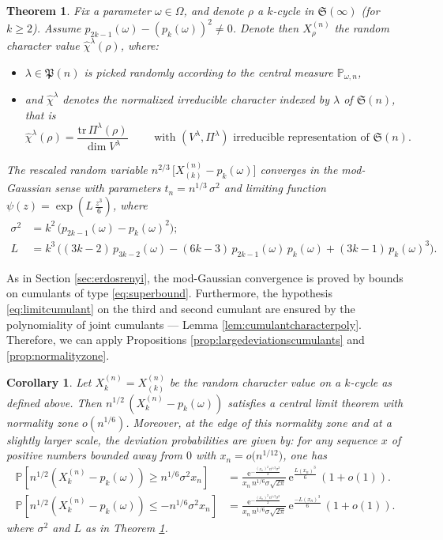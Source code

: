 \documentclass[12pt,a4paper,reqno]{amsart}
\newtheorem{theorem}[lemma]{Theorem}
\newtheorem{corollary}[lemma]{Corollary}
\theoremstyle{remark}
\newcommand{\E}{\mathrm{e}}
\newcommand{\proba}{\mathbb{P}}
\newcommand{\SubGraph}{X^{(n)}}
\newcommand{\RCV}{X^{(n)}_{\rho}}
\newcommand{\RCVk}{X^{(n)}_{(k)}}
\newcommand{\sym}{\mathfrak{S}}
\newcommand{\pym}{\mathfrak{P}}
\begin{document}
\begin{theorem}\label{thm:modgaussianrcv}
Fix a parameter $\omega \in \Omega$, and denote $\rho$ a $k$-cycle in $\sym(\infty)$ (for $k \ge 2$). Assume $p_{2k-1}(\omega)-(p_{k}(\omega))^{2}\neq 0$. Denote then $\RCV$ the random character value $\widehat{\chi}^{\lambda}(\rho)$, where:\vspace{2mm}
\begin{itemize}
\item $\lambda \in \pym(n)$ is picked randomly according to the central measure $\proba_{\omega,n}$, \vspace{2mm}
\item and $\widehat{\chi}^{\lambda}$ denotes the normalized irreducible character indexed by $\lambda$ of $\sym(n)$, that is 
$$\widehat{\chi}^{\lambda}(\rho)=\frac{\mathrm{tr}\, \Pi^{\lambda}(\rho)}{\dim V^{\lambda}}\qquad \text{ with }(V^{\lambda},\Pi^{\lambda}) \text{ irreducible representation of }\sym(n).$$
\end{itemize}
The rescaled random variable $n^{2/3}\,\big[\RCVk-p_{k}(\omega)\big]$ converges in the mod-Gaussian sense with parameters $t_{n}=n^{1/3}\,\sigma^{2}$ and limiting function $\psi(z)=\exp(L\,\frac{z^{3}}{6})$, where
\begin{align*}
\sigma^{2}&=k^{2}\,\big(p_{2k-1}(\omega)-p_{k}(\omega)^{2}\big);\\
L&= k^{3}\,\big((3k-2)\,p_{3k-2}(\omega)-(6k-3)\,p_{2k-1}(\omega)\,p_{k}(\omega)+(3k-1)\,p_{k}(\omega)^{3}\big).
\end{align*}
\end{theorem}

As in Section \ref{sec:erdosrenyi}, the mod-Gaussian convergence is proved by bounds on cumulants of type \eqref{eq:superbound}.
Furthermore, the hypothesis \eqref{eq:limitcumulant} on the third and second cumulant are ensured
by the polynomiality of joint cumulants --- Lemma \ref{lem:cumulantcharacterpoly}.
Therefore, we can apply Propositions \ref{prop:largedeviationscumulants} and \ref{prop:normalityzone}.
\begin{corollary}\label{cor:moderatedeviationcharacter}
Let $\SubGraph_{k}=\RCVk$ be the random character value on a $k$-cycle as defined above.
Then $n^{1/2}\, (\SubGraph_{k}-p_{k}(\omega))$ satisfies a central limit theorem with normality zone 
$o(n^{1/6})$.
Moreover, at the edge of this normality zone and at a slightly larger scale, the deviation probabilities are given by:
for any sequence $x$ of positive numbers bounded away from $0$ with $x_n=o\big( n^{1/12} \big)$,
one has
\begin{align*}
    \proba\left[n^{1/2} (\SubGraph_{k}-p_{k}(\omega))\geq n^{1/6} \sigma^2 x_n\right]&=
\frac{\E^{-\frac{(x_n)^2\, n^{1/3}\sigma^2}{2}}}{x_n\, n^{1/6}\sigma \sqrt{2\pi}}\,\E^{\frac{L(x_n)^3}{6}}\,(1+o(1)).\\
    \proba\left[n^{1/2} (\SubGraph_{k}-p_{k}(\omega))\leq - n^{1/6} \sigma^2 x_n\right]&=
\frac{\E^{-\frac{(x_n)^2\, n^{1/3}\sigma^2}{2}}}{x_n\, n^{1/6}\sigma \sqrt{2\pi}}\,\E^{\frac{-L(x_n)^3}{6}}\,(1+o(1)).
\end{align*}
where $\sigma^{2}$ and $L$ as in Theorem \ref{thm:modgaussianrcv}.
\end{corollary}\bigskip
\end{document}
